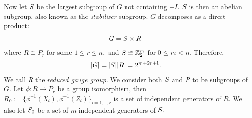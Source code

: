 Now let $S$ be the largest subgroup of $G$ not containing
$-I.$
$S$ is then an abelian subgroup,
also known as the {\it stabilizer} subgroup.
$G$ decomposes as a direct product:
$$G = S\times R,$$
where $R\cong P_r$ for some $1\le r\le n,$
and $S\cong \mathbb{Z}_2^{m}$ for $0\le m<n.$
Therefore, 
$$|G| = |S| |R| = 2^{m+2r+1}.$$
We call $R$ the {\it reduced gauge group}.
We consider both $S$ and $R$ to be subgroups of $G.$
Let $\phi:R\to P_r$ be a group isomorphism,
then $R_0 := \{\phi^{-1}(X_i), \phi^{-1}(Z_i)\}_{i=1,..,r}$
is a set of independent generators of $R.$
We also let $S_0$ be a set of $m$ independent generators of $S.$

